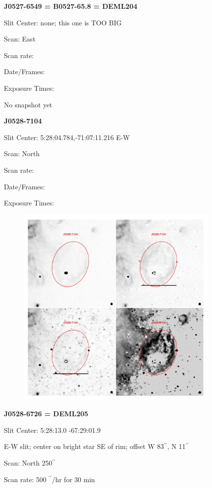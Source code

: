 \documentclass[11pt]{article}
\begin{document}
\newpage
{\bf J0527-6549 = B0527-65.8 = DEML204}  
 
Slit Center:   none; this one is TOO BIG

Scan:  East

Scan rate:  

Date/Frames:

Exposure Times:  

No snapshot yet
\begin{figure}
\end{figure}

\newpage
{\bf J0528-7104}  
 
Slit Center:   5:28:04.784,-71:07:11.216  E-W

Scan:  North

Scan rate:  

Date/Frames:

Exposure Times:  

\begin{figure}
\includegraphics[width=10.05cm]{snapshots/J0528-7104_big.png}
\end{figure}

\newpage
{\bf J0528-6726 = DEML205}  
 
Slit Center:   5:28:13.0  -67:29:01.9  

E-W slit; center on bright star SE of rim; offset W 83$^{\prime\prime}$, N 11$^{\prime\prime}$

Scan:  North 250$^{\prime\prime}$

Scan rate:  500 $^{\prime\prime}$/hr for 30 min

\end{document}

